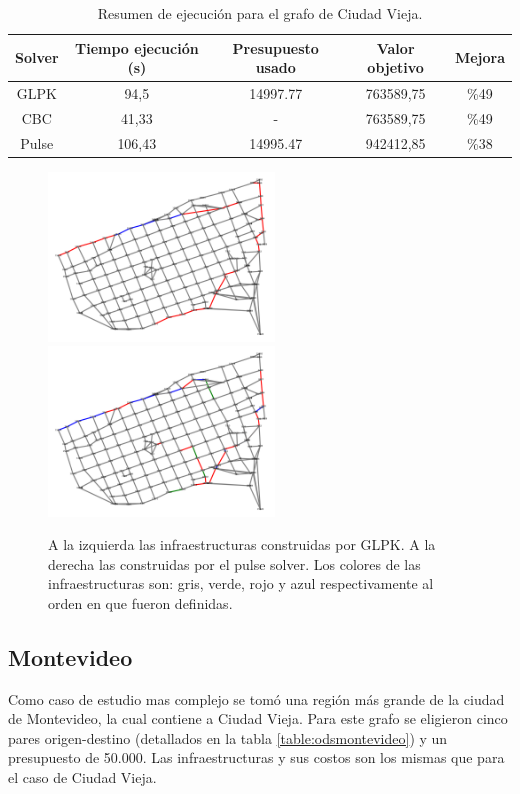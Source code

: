 \documentclass{article}
\begin{document}
  \begin{table}[h!]
    \centering
    \begin{tabular}{ccccc}
      \toprule
      Solver & Tiempo ejecución (s) & Presupuesto usado & Valor objetivo & Mejora \\
      \midrule
      GLPK  & 94,5   & 14997.77 & 763589,75 & \%49 \\
      CBC   & 41,33  & -        & 763589,75 & \%49 \\
      Pulse & 106,43 & 14995.47 & 942412,85 & \%38 \\
      \bottomrule
    \end{tabular}
    \caption{Resumen de ejecución para el grafo de Ciudad Vieja.}\label{table:resultadosciudadvieja}
  \end{table}

  \begin{figure}[h!]
    \centering
    \includegraphics[width=6cm]{imgs/mdeo_med_glpk.png}
    \includegraphics[width=6cm]{imgs/mdeo_med_pulse.png}
    \caption{A la izquierda las infraestructuras construidas por GLPK. A la derecha las construidas por el pulse solver. Los colores de las infraestructuras son: gris, verde, rojo y azul respectivamente al orden en que fueron definidas.}
    \label{resultadosciudadvieja}
  \end{figure}

  \subsection*{Montevideo}

  Como caso de estudio mas complejo se tomó una región más grande de la ciudad de Montevideo, la cual contiene a Ciudad Vieja. Para este grafo se eligieron cinco pares origen-destino (detallados en la tabla \ref{table:odsmontevideo}) y un presupuesto de 50.000. Las infraestructuras y sus costos son los mismas que para el caso de Ciudad Vieja.
\end{document}
